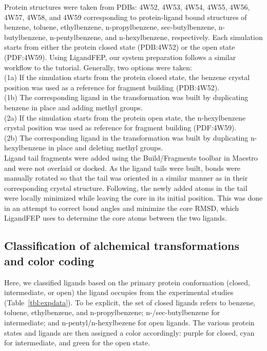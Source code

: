 \documentclass[journal=jctcce,manuscript=article]{achemso}
\begin{document}
Protein structures were taken from PDBs: 4W52, 4W53, 4W54, 4W55, 4W56, 4W57, 4W58, and 4W59 corresponding to protein-ligand bound structures of benzene, toluene, ethylbenzene, n-propylbenzene, sec-butylbenzene, n-butylbenzene, n-pentylbenzene, and n-hexylbenzene, respectively\cite{Merski2015}.
Each simulation starts from either the protein closed state (PDB:4W52) or the open state (PDF:4W59).
Using LigandFEP, our system preparation follows a similar workflow to the tutorial\cite{LigandFEP}.
Generally, two options were taken:\\
(1a) If the simulation starts from the protein closed state, the benzene crystal position was used as a reference for fragment building (PDB:4W52).\\
(1b) The corresponding ligand in the transformation was built by duplicating benzene in place and adding methyl groups.\\
(2a) If the simulation starts from the protein open state, the n-hexylbenzene crystal position was used as reference for fragment building (PDF:4W59).\\
(2b) The corresponding ligand in the transformation was built by duplicating n-hexylbenzene in place and deleting methyl groups.\\
Ligand tail fragments were added using the Build/Fragments toolbar in Maestro  and were not overlaid or docked. 
As the ligand tails were built, bonds were manually rotated so that the tail was oriented in a similar manner as in their corresponding crystal structure.
Following, the newly added atoms in the tail were locally minimized while leaving the core in its initial position.
This was done in an attempt to correct bond angles and minimize the core RMSD, which LigandFEP uses to determine the core atoms between the two ligands.

\subsection*{Classification of alchemical transformations and color coding}
Here, we classified ligands based on the primary protein conformation (closed, intermediate, or open) the ligand occupies from the experimental studies (Table~\ref{tbl:expdata}).
To be explicit, the set of closed ligands refers to benzene, toluene, ethylbenzene, and n-propylbenzene; n-/sec-butylbenzene for intermediate; and n-pentyl/n-hexylbezene for open ligands.
The various protein states and ligands are then assigned a color accordingly: purple for closed, cyan for intermediate, and green for the open state.
\end{document}
